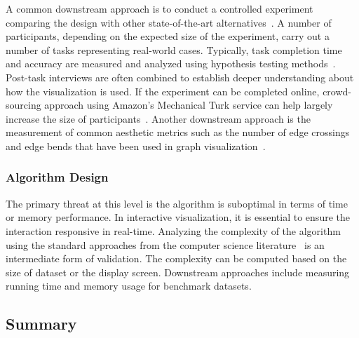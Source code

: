 A common downstream approach is to conduct a controlled experiment comparing the design with other state-of-the-art alternatives~\cite{Xu2012}. A number of participants, depending on the  expected size of the experiment, carry out a number of tasks representing real-world cases. Typically, task completion time and accuracy are measured and analyzed using hypothesis testing methods~\cite{Field2003}. Post-task interviews are often combined to establish deeper understanding about how the visualization is used. If the experiment can be completed online, crowd-sourcing approach using Amazon's Mechanical Turk service can help largely increase the size of participants~\cite{Heer2010a}. Another downstream approach is the measurement of common aesthetic metrics such as the number of edge crossings and edge bends that have been used in graph visualization~\cite{Sugiyama1981}.

\subsubsection{Algorithm Design}
The primary threat at this level is the algorithm is suboptimal in terms of time or memory performance. In interactive visualization, it is essential to ensure the interaction responsive in real-time. Analyzing the complexity of the algorithm using the standard approaches from the computer science literature~\cite{Cormen2009} is an intermediate form of validation. The complexity can be computed based on the size of dataset or the display screen. Downstream approaches include measuring running time and memory usage for benchmark datasets.


\subsection{Summary}
